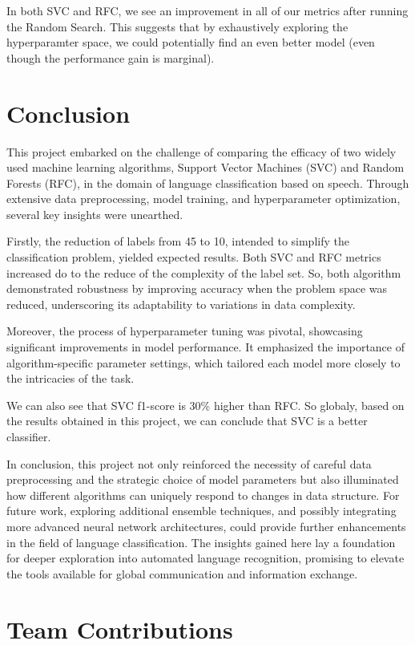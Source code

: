 \documentclass[twocolumn]{article}
\begin{document}
In both SVC and RFC, we see an improvement in all of our metrics after running the Random Search. This suggests that by exhaustively exploring the hyperparamter space, we could potentially find an even better model (even though the performance gain is marginal).  



\section{Conclusion}
\label{6}
This project embarked on the challenge of comparing the efficacy of two widely used machine learning algorithms, Support Vector Machines (SVC) and Random Forests (RFC), in the domain of language classification based on speech. Through extensive data preprocessing, model training, and hyperparameter optimization, several key insights were unearthed.

Firstly, the reduction of labels from 45 to 10, intended to simplify the classification problem, yielded expected results. Both SVC and RFC metrics increased do to the reduce of the complexity of the label set. So, both algorithm demonstrated robustness by improving accuracy when the problem space was reduced, underscoring its adaptability to variations in data complexity.

Moreover, the process of hyperparameter tuning was pivotal, showcasing significant improvements in model performance. It emphasized the importance of algorithm-specific parameter settings, which tailored each model more closely to the intricacies of the task.

We can also see that SVC f1-score is 30\% higher than RFC. So globaly, based on the results obtained in this project, we can conclude that SVC is a better classifier.

In conclusion, this project not only reinforced the necessity of careful data preprocessing and the strategic choice of model parameters but also illuminated how different algorithms can uniquely respond to changes in data structure. For future work, exploring additional ensemble techniques, and possibly integrating more advanced neural network architectures, could provide further enhancements in the field of language classification. The insights gained here lay a foundation for deeper exploration into automated language recognition, promising to elevate the tools available for global communication and information exchange.



\section{Team Contributions}
\label{7}
\end{document}

